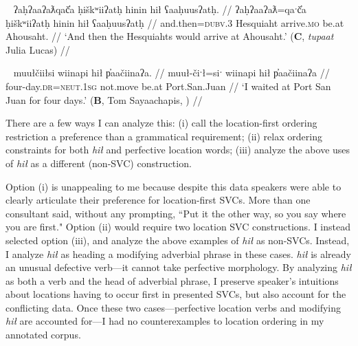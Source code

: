 \ex~ \label{ex:atahousaht2}
\begingl
\glpreamble ʔaḥʔaaʔaƛqač̓a ḥiškʷiiʔatḥ hinin hił ʕaaḥuusʔatḥ. //
\gla ʔaḥʔaaʔaƛ=qaˑč̓a ḥiškʷiiʔatḥ hinin hił ʕaaḥuusʔatḥ  //
\glb and.then=\textsc{dubv.3} Hesquiaht arrive.\textsc{mo} be.at Ahousaht. //
\glft `And then the Hesquiahts would arrive at Ahousaht.' (\textbf{C}, \textit{tupaat} Julia Lucas) //
\endgl
\xe 

\begin{comment}
\ex \label{ex:sleepinacanoe}
\begingl
\glpreamble weʔič̓aḥsʔaƛ k̓ʷalsic hił ʔanaḥʔis č̓apac ʔatḥii. //
\gla weʔič-!aḥs=!aƛ k̓ʷalsic hił ʔanaḥ=ʔis č̓apac ʔatḥii  //
\glb sleep.\textsc{dr}-in.a.vessel=\textsc{now} Kwalisits be.at size=\textsc{dim} canoe night. //
\glft `Kwalisits was sleeping in his little canoe through the night.' (\textbf{B}, Tom Sayaachapis, \citet[p.~3]{sapir1924}) //
\endgl
\xe
\end{comment}

\ex~ \label{ex:waitatsanjuan}
\begingl
\glpreamble muułčiiłsi wiinapi hił p̓aačiinaʔa. //
\gla muuł-čiˑł=siˑ wiinapi hił p̓aačiinaʔa  //
\glb four-day.\textsc{dr}=\textsc{neut.1sg} not.move be.at Port.San.Juan //
\glft `I waited at Port San Juan for four days.' (\textbf{B}, Tom Sayaachapis, \citealt[p.~148]{sapir1939}) //
\endgl
\xe

There are a few ways I can analyze this: (i) call the location-first ordering restriction a preference than a grammatical requirement; (ii) relax ordering constraints for both \textit{hił} and perfective location words; (iii) analyze the above uses of \textit{hił} as a different (non-SVC) construction.

Option (i) is unappealing to me because despite this data speakers were able to clearly articulate their preference for location-first SVCs. More than one consultant said, without any prompting, ``Put it the other way, so you say where you are first." Option (ii) would require two location SVC constructions. I instead selected option (iii), and analyze the above examples of \textit{hił} as non-SVCs. Instead, I analyze \textit{hił} as heading a modifying adverbial phrase in these cases. \textit{hił} is already an unusual defective verb---it cannot take perfective morphology. By analyzing \textit{hił} as both a verb and the head of adverbial phrase, I preserve speaker's intuitions about locations having to occur first in presented SVCs, but also account for the conflicting data. Once these two cases---perfective location verbs and modifying \textit{hił} are accounted for---I had no counterexamples to location ordering in my annotated corpus.

